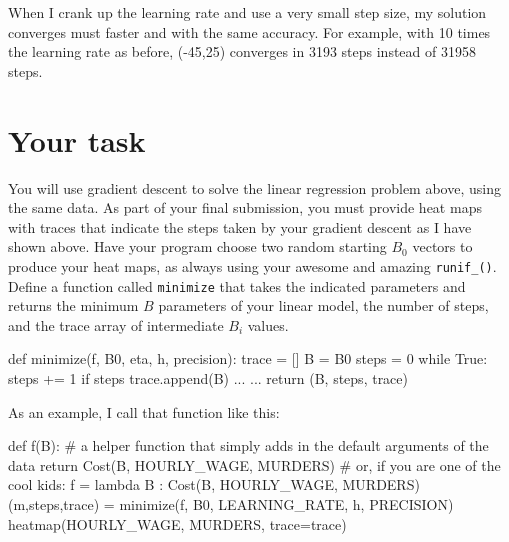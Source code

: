\begin{fullwidth}
\noindent {}

When I crank up the learning rate and use a very small step size, my solution converges must faster and with the same accuracy. For example, with 10 times the learning rate as before, (-45,25) converges in 3193 steps instead of 31958 steps.

\section{Your task}

You will use gradient descent to solve the linear regression problem above, using the same data. As part of your final submission, you must provide heat maps with traces that indicate the steps taken by your gradient descent as I have shown above.  Have your program choose two random starting $B_0$ vectors to produce your heat maps, as always using your awesome and amazing {\tt runif\_()}.   Define a function called {\tt minimize} that takes the indicated parameters and returns the minimum $B$ parameters of your linear model, the number of steps, and the trace array of intermediate $B_i$ values.

\begin{pyverbatim}
def minimize(f, B0, eta, h, precision):
    trace = []
    B = B0
    steps = 0 
    while True:
        steps += 1
        if steps %
            trace.append(B)
        ...     
    ... 
    return (B, steps, trace)
\end{pyverbatim}

As an example, I call that function like this:

\begin{pyverbatim}
def f(B): # a helper function that simply adds in the default arguments of the data
    return Cost(B, HOURLY_WAGE, MURDERS)
# or, if you are one of the cool kids:
f = lambda B : Cost(B, HOURLY_WAGE, MURDERS)
(m,steps,trace) = minimize(f, B0, LEARNING_RATE, h, PRECISION)
heatmap(HOURLY_WAGE, MURDERS, trace=trace)
\end{pyverbatim}


\end{fullwidth}
